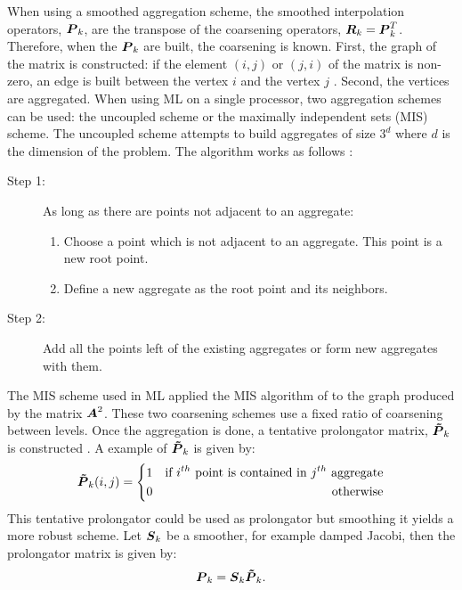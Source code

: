 When using a smoothed aggregation scheme, the smoothed interpolation operators,
$\boldsymbol{P}_k$, are the transpose of the coarsening operators,
$\boldsymbol{R}_k=\boldsymbol{P}_k^T$. Therefore, when the $\boldsymbol{P}_k$ are built, the
coarsening is known. First, the graph of the matrix is constructed: if the element
$(i,j)$ or $(j,i)$ of the matrix is non-zero, an edge is built between the
vertex $i$ and the vertex $j$ \cite{ml_guide}. Second, the vertices are
aggregated. When using ML on a single processor, two aggregation schemes can
be used: the uncoupled scheme or the maximally independent sets (MIS) scheme. 
The uncoupled scheme attempts to build aggregates of size $3^d$ where $d$ is the
dimension of the problem. The algorithm works as follows \cite{mis}:
\begin{description}
  \item[Step 1:] As long as there are points not adjacent to an aggregate:
    \begin{enumerate}
      \item Choose a point which is not adjacent to an aggregate. This point
        is a new root point.
      \item Define a new aggregate as the root point and its neighbors.
    \end{enumerate}
  \item[Step 2:] Add all the points left of the existing aggregates or form 
    new aggregates with them.
\end{description}
The MIS scheme used in ML applied the MIS algorithm of \cite{graph_coloring} to
the graph produced by the matrix $\boldsymbol{A}^2$. These two coarsening 
schemes use a fixed ratio of coarsening between levels. Once the aggregation is 
done, a tentative prolongator matrix, $\boldsymbol{\tilde{P}}_k$ is constructed 
\cite{mis}. A example of $\boldsymbol{\tilde{P}}_k$ is given by:
\begin{equation}
  \boldsymbol{\tilde{P}}_k(i,j) = \left\{
  \begin{aligned}
    &1 &\textrm{if }i^{th}\textrm{ point is contained in }j^{th}\textrm{
    aggregate}\\
    & 0 &\textrm{otherwise}
  \end{aligned}
  \right.
\end{equation}
This tentative prolongator could be used as prolongator but smoothing it
yields a more robust scheme. Let $\boldsymbol{S}_k$ be a smoother, for example
damped Jacobi, then the prolongator matrix is given by:
\begin{equation}
  \boldsymbol{P}_k = \boldsymbol{S}_k \boldsymbol{\tilde{P}}_k.
\end{equation}

